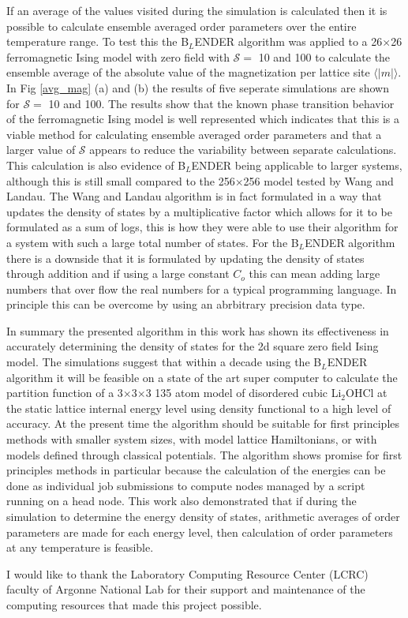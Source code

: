 \documentclass[aps,prl,reprint,superscriptaddress,showkeys]{revtex4-1}
\begin{document}
If an average of the values visited  during the simulation is calculated then it is possible to calculate ensemble averaged order parameters over the entire temperature range.  To test this the B$_L$ENDER algorithm was applied to a 26$\times$26 ferromagnetic Ising model with zero field with $\mathcal{S}=$ 10 and 100 to calculate the ensemble average of the absolute value of the magnetization per lattice site $\langle |m| \rangle$. In Fig \ref{avg_mag} (a) and (b) the results of five seperate simulations are shown for $\mathcal{S}=$ 10 and 100.  The results show that the known phase transition behavior of the ferromagnetic Ising model is well represented which indicates that this is a viable method for calculating ensemble averaged order parameters and that a larger value of $\mathcal{S}$ appears to reduce the variability between separate calculations.  This calculation is also evidence of B$_L$ENDER being applicable to larger systems, although this is still small compared to the 256$\times$256 model tested by Wang and Landau. The Wang and Landau algorithm is in fact formulated in a way that updates the  density of states by a multiplicative factor which allows for it to be formulated as a sum of logs, this is how they were able to use their algorithm for a system with such a large total number of states.  For the B$_L$ENDER algorithm there is a downside that it is formulated by updating the  density of states through addition and if using a large constant $C_o$  this can mean adding large numbers that over flow the real numbers for a typical programming language. In principle this can be overcome by using an  abrbitrary precision data type. 

In summary the presented algorithm in this work has shown its effectiveness in accurately determining the density of states for the 2d square zero field Ising model.  The simulations suggest that within a decade using the B$_L$ENDER algorithm  it will be feasible on a state of the art super computer to calculate the partition function of a 3$\times$3$\times$3 135 atom model of disordered cubic Li$_2$OHCl at the static lattice internal energy level using  density functional to a high level of accuracy. At the present time the algorithm should be suitable for first principles methods with smaller system sizes, with model lattice Hamiltonians, or with models defined through classical potentials. The algorithm shows promise for first principles methods in particular because the calculation of the energies can be done as individual job submissions to compute nodes managed by a script running on a head node. This work also demonstrated that if during the simulation to determine the energy density of states, arithmetic  averages of order parameters are made for each energy level, then calculation of order parameters at any temperature is feasible.
 
\begin{acknowledgments}
I would like to thank the Laboratory Computing Resource Center (LCRC) faculty of Argonne National Lab for their support and maintenance of the computing resources that made this project possible. 
\end{acknowledgments}


\end{document}
